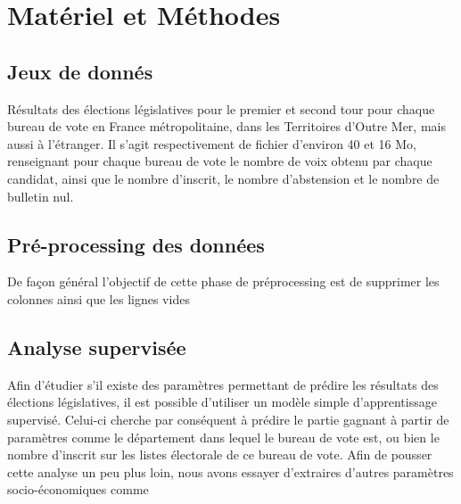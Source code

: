 \documentclass[11pt]{article}
\begin{document}
    \newpage
    \section{Matériel et Méthodes}

        \subsection*{Jeux de donnés}
            Résultats des élections législatives pour le premier et second tour pour chaque bureau de vote en France métropolitaine, dans les Territoires d'Outre Mer, mais aussi à  l'étranger. Il s'agit respectivement de fichier d'environ 40 et 16 Mo, renseignant pour chaque bureau de vote le nombre de voix obtenu par chaque candidat, ainsi que le nombre d'inscrit, le nombre d'abstension et le nombre de bulletin nul.
        
        \subsection*{Pré-processing des données}
            De façon général l'objectif de cette phase de préprocessing est de supprimer les colonnes ainsi que les lignes vides 

        \subsection*{Analyse supervisée}
            Afin d'étudier s'il existe des paramètres permettant de prédire les résultats des élections législatives, il est possible d'utiliser un modèle simple d'apprentissage supervisé. Celui-ci cherche par conséquent à prédire le partie gagnant à partir de paramètres comme le département dans lequel le bureau de vote est, ou bien le nombre d'inscrit sur les listes électorale de ce bureau de vote.
            Afin de pousser cette analyse un peu plus loin, nous avons essayer d'extraires d'autres paramètres socio-économiques comme
\end{document}
